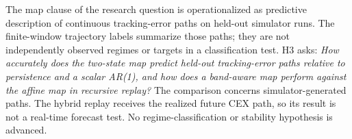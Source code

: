 The map clause of the research question is operationalized as predictive description of continuous tracking-error paths on held-out simulator runs. The finite-window trajectory labels summarize those paths; they are not independently observed regimes or targets in a classification test. H3 asks:
\emph{How accurately does the two-state map predict held-out tracking-error paths relative to persistence and a scalar AR(1), and how does a band-aware map perform against the affine map in recursive replay?}
The comparison concerns simulator-generated paths. The hybrid replay receives the realized future CEX path, so its result is not a real-time forecast test. No regime-classification or stability hypothesis is advanced.
